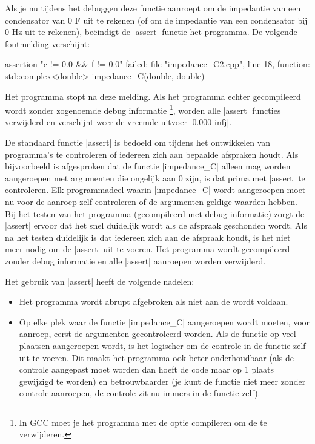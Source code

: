 \begin{cpplstShortInline}

Als je nu tijdens het debuggen deze functie aanroept om de impedantie van een condensator van 0 F uit te rekenen (of om de impedantie van een condensator bij 0 Hz uit te rekenen), beëindigt de |assert| functie het programma.
De volgende foutmelding verschijnt:

\begin{cpplstfragment}[language=]
assertion "c != 0.0 && f != 0.0" failed: file "impedance_C2.cpp", line 18, function: std::complex<double> impedance_C(double, double)
\end{cpplstfragment}

Het programma stopt na deze melding.
Als het programma echter gecompileerd wordt zonder zogenoemde debug informatie%
\footnote{%
    In GCC moet je het programma met de optie  compileren om de  te verwijderen.
}, worden alle |assert| functies verwijderd en verschijnt weer de vreemde uitvoer |0.000-infj|.

De standaard functie |assert| is bedoeld om tijdens het ontwikkelen van programma's te controleren of iedereen zich aan bepaalde afspraken houdt.
Als bijvoorbeeld is afgesproken dat de functie |impedance_C| alleen mag worden aangeroepen met argumenten die ongelijk aan 0 zijn, is dat prima met |assert| te controleren.
Elk programmadeel waarin |impedance_C| wordt aangeroepen moet nu voor de aanroep zelf controleren of de argumenten geldige waarden hebben.
Bij het testen van het programma (gecompileerd met debug informatie) zorgt de |assert| ervoor dat het snel duidelijk wordt als de afspraak geschonden wordt.
Als na het testen duidelijk is dat iedereen zich aan de afspraak houdt, is het niet meer nodig om de |assert| uit te voeren.
Het programma wordt gecompileerd zonder debug informatie en alle |assert| aanroepen worden verwijderd.

Het gebruik van |assert| heeft de volgende nadelen:
\begin{itemize}
    \item Het programma wordt abrupt afgebroken als niet aan de  wordt voldaan. 
    \item Op elke plek waar de functie |impedance_C| aangeroepen wordt moeten, voor aanroep, eerst de argumenten gecontroleerd worden.
    Als de functie op veel plaatsen aangeroepen wordt, is het logischer om de controle in de functie zelf uit te voeren.
    Dit maakt het programma ook beter onderhoudbaar (als de controle aangepast moet worden dan hoeft de code maar op 1 plaats gewijzigd te worden) en betrouwbaarder (je kunt de functie niet meer zonder controle aanroepen, de controle zit nu immers in de functie zelf).
\end{itemize}


\end{cpplstShortInline}
